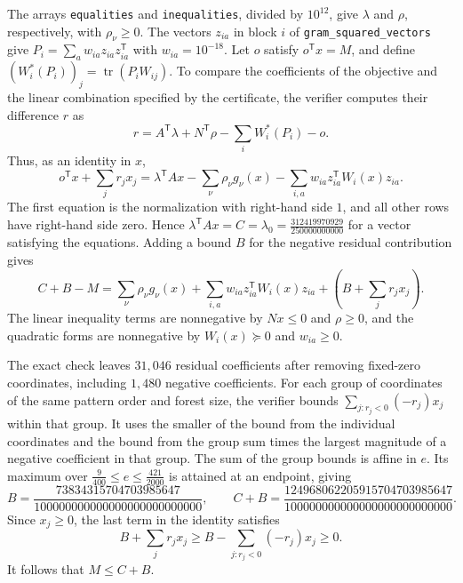 \documentclass[preprint,11pt,numbers]{elsarticle-arxiv}
\numberwithin{equation}{section}
\theoremstyle{definition}
\DeclareMathOperator{\tr}{tr}
\begin{document}
The arrays \texttt{equalities} and \texttt{inequalities}, divided
by $10^{12}$, give $\lambda$ and $\rho$, respectively, with
$\rho_\nu\geq0$. The vectors $z_{ia}$ in block $i$ of
\texttt{gram\_squared\_vectors} give
$P_i=\sum_a w_{ia}z_{ia}z_{ia}^{\mathsf T}$ with $w_{ia}=10^{-18}$.
Let $o$ satisfy $o^{\mathsf T}x=M$, and define
$(W_i^*(P_i))_j=\tr(P_iW_{ij})$. To compare the coefficients
of the objective and the linear combination specified by the
certificate, the verifier computes their difference $r$ as
\[
 r=A^{\mathsf T}\lambda+N^{\mathsf T}\rho
   -\sum_i W_i^*(P_i)-o.
\]
Thus, as an identity in $x$,
\[
 o^{\mathsf T}x+\sum_j r_jx_j
 =\lambda^{\mathsf T}Ax-\sum_\nu\rho_\nu g_\nu(x)
  -\sum_{i,a} w_{ia}z_{ia}^{\mathsf T}W_i(x)z_{ia}.
\]
The first equation is the normalization with right-hand side
$1$, and all other rows have right-hand side zero. Hence
$\lambda^{\mathsf T}Ax=C=\lambda_0
=\frac{312419970929}{250000000000}$ for a vector satisfying the
equations. Adding a bound $B$ for the negative residual
contribution gives
\[
 C+B-M
 =\sum_\nu\rho_\nu g_\nu(x)
  +\sum_{i,a}w_{ia}z_{ia}^{\mathsf T}W_i(x)z_{ia}
  +\left(B+\sum_j r_jx_j\right).
\]
The linear inequality terms are nonnegative by $Nx\leq0$ and
$\rho\geq0$, and the quadratic forms are nonnegative by
$W_i(x)\succeq0$ and $w_{ia}\geq0$.

The exact check leaves $31{,}046$ residual coefficients after
removing fixed-zero coordinates, including $1{,}480$ negative
coefficients. For each group of coordinates of the same pattern
order and forest size, the verifier bounds
$\sum_{j:r_j<0}(-r_j)x_j$ within that group. It uses the smaller
of the bound from the individual coordinates and the bound from
the group sum times the largest magnitude of a negative
coefficient in that group. The sum of the group bounds is
affine in $e$. Its maximum over
$\frac{9}{400}\leq e\leq\frac{421}{2000}$ is attained at an
endpoint, giving
\begin{equation}\label{eq:final-uniform-decomposition}
 B=\frac{73834315704703985647}{100000000000000000000000000},
 \qquad
 C+B=\frac{124968062205915704703985647}
                {100000000000000000000000000}.
\end{equation}
Since $x_j\geq0$, the last term in the identity satisfies
\[
 B+\sum_j r_jx_j\geq B-\sum_{j:r_j<0}(-r_j)x_j\geq0.
\]
It follows that $M\leq C+B$.
\end{document}
